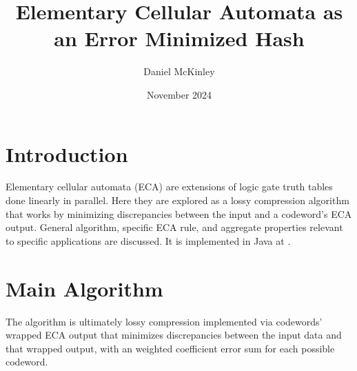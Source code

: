 \documentclass[11pt]{article}
\title{Elementary Cellular Automata as an Error Minimized Hash}
\date{November 2024}
\author{Daniel McKinley}
\begin{document}
\maketitle

\section{Introduction}

Elementary cellular automata (ECA) are extensions of logic gate truth tables done linearly in parallel. \cite{Wolfram}
Here they are explored as a lossy compression algorithm that works by minimizing discrepancies between
the input and a codeword's ECA output. General algorithm, specific ECA rule, and aggregate properties relevant 
to specific applications are discussed. It is implemented in Java at \cite{mygit}. 
\\
\section{Main Algorithm}
The algorithm is ultimately lossy compression implemented via codewords' wrapped ECA output that minimizes discrepancies between the input data and that wrapped output, with an weighted coefficient error sum for each possible codeword.
\end{document}
